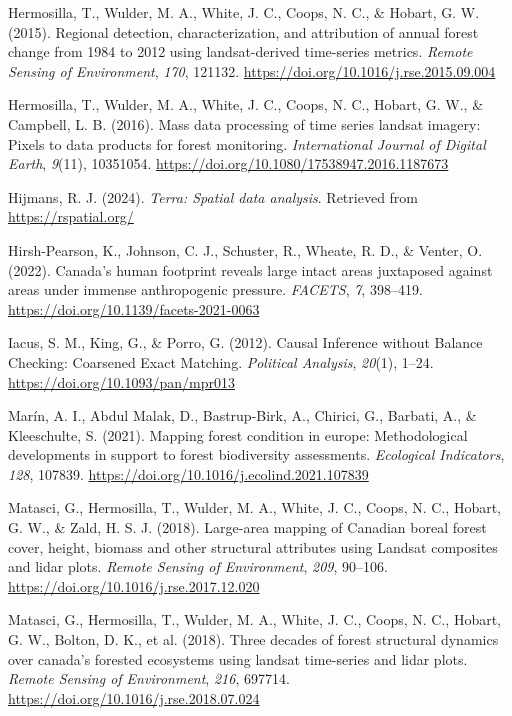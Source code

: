 \documentclass[
]{agujournal2019}
\newlength{\cslhangindent}
\newenvironment{CSLReferences}[2] %
 {\begin{list}{}{%
  \setlength{\itemindent}{0pt}
  \setlength{\leftmargin}{0pt}
  \setlength{\parsep}{0pt}
  \ifodd #1
   \setlength{\leftmargin}{\cslhangindent}
   \setlength{\itemindent}{-1\cslhangindent}
  \fi
  \setlength{\itemsep}{#2\baselineskip}}}
 {\end{list}}
\begin{document}
\begin{CSLReferences}{1}{0}
Hermosilla, T., Wulder, M. A., White, J. C., Coops, N. C., \& Hobart, G.
W. (2015). Regional detection, characterization, and attribution of
annual forest change from 1984 to 2012 using landsat-derived time-series
metrics. \emph{Remote Sensing of Environment}, \emph{170}, 121132.
\url{https://doi.org/10.1016/j.rse.2015.09.004}

Hermosilla, T., Wulder, M. A., White, J. C., Coops, N. C., Hobart, G.
W., \& Campbell, L. B. (2016). Mass data processing of time series
landsat imagery: Pixels to data products for forest monitoring.
\emph{International Journal of Digital Earth}, \emph{9}(11), 10351054.
\url{https://doi.org/10.1080/17538947.2016.1187673}

Hijmans, R. J. (2024). \emph{Terra: Spatial data analysis}. Retrieved
from \url{https://rspatial.org/}

Hirsh-Pearson, K., Johnson, C. J., Schuster, R., Wheate, R. D., \&
Venter, O. (2022). Canada{'}s human footprint reveals large intact areas
juxtaposed against areas under immense anthropogenic pressure.
\emph{FACETS}, \emph{7}, 398--419.
\url{https://doi.org/10.1139/facets-2021-0063}

Iacus, S. M., King, G., \& Porro, G. (2012). Causal Inference without
Balance Checking: Coarsened Exact Matching. \emph{Political Analysis},
\emph{20}(1), 1--24. \url{https://doi.org/10.1093/pan/mpr013}

Marín, A. I., Abdul Malak, D., Bastrup-Birk, A., Chirici, G., Barbati,
A., \& Kleeschulte, S. (2021). Mapping forest condition in europe:
Methodological developments in support to forest biodiversity
assessments. \emph{Ecological Indicators}, \emph{128}, 107839.
\url{https://doi.org/10.1016/j.ecolind.2021.107839}

Matasci, G., Hermosilla, T., Wulder, M. A., White, J. C., Coops, N. C.,
Hobart, G. W., \& Zald, H. S. J. (2018). Large-area mapping of Canadian
boreal forest cover, height, biomass and other structural attributes
using Landsat composites and lidar plots. \emph{Remote Sensing of
Environment}, \emph{209}, 90--106.
\url{https://doi.org/10.1016/j.rse.2017.12.020}

Matasci, G., Hermosilla, T., Wulder, M. A., White, J. C., Coops, N. C.,
Hobart, G. W., Bolton, D. K., et al. (2018). Three decades of forest
structural dynamics over canada's forested ecosystems using landsat
time-series and lidar plots. \emph{Remote Sensing of Environment},
\emph{216}, 697714. \url{https://doi.org/10.1016/j.rse.2018.07.024}


\end{CSLReferences}
\end{document}
